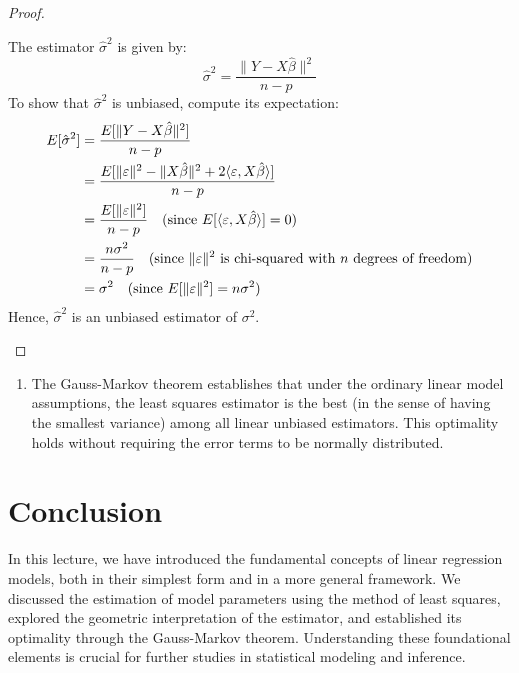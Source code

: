 \documentclass[open=any, 11pt,paper=A4]{scrreprt}
\begin{document}
\begin{proof}
\begin{enumerate}
        The estimator \( \hat{\sigma}^2 \) is given by:
        \[
        \hat{\sigma}^2 = \frac{\| Y - X \hat{\beta} \|^2}{n - p}
        \]
        To show that \( \hat{\sigma}^2 \) is unbiased, compute its expectation:
        \begin{align*}
            E[\hat{\sigma}^2] &= \frac{E[\| Y - X \hat{\beta} \|^2]}{n - p} \\
            &= \frac{E[\| \varepsilon \|^2 - \| X \hat{\beta} \|^2 + 2 \langle \varepsilon, X \hat{\beta} \rangle]}{n - p} \\
            &= \frac{E[\| \varepsilon \|^2]}{n - p} \quad \text{(since \( E[\langle \varepsilon, X \hat{\beta} \rangle] = 0 \))} \\
            &= \frac{n \sigma^2}{n - p} \quad \text{(since \( \| \varepsilon \|^2 \) is chi-squared with \( n \) degrees of freedom)} \\
            &= \sigma^2 \quad \text{(since \( E[\| \varepsilon \|^2] = n \sigma^2 \))}
        \end{align*}
        Hence, \( \hat{\sigma}^2 \) is an unbiased estimator of \( \sigma^2 \).
    \end{enumerate}
\end{proof}

\begin{remark}
    \begin{enumerate}
        \item The Gauss-Markov theorem establishes that under the ordinary linear model assumptions, the least squares estimator is the best (in the sense of having the smallest variance) among all linear unbiased estimators. This optimality holds without requiring the error terms to be normally distributed.
    \end{enumerate}
\end{remark}

\section{Conclusion}

In this lecture, we have introduced the fundamental concepts of linear regression models, both in their simplest form and in a more general framework. We discussed the estimation of model parameters using the method of least squares, explored the geometric interpretation of the estimator, and established its optimality through the Gauss-Markov theorem. Understanding these foundational elements is crucial for further studies in statistical modeling and inference.
\end{document}
